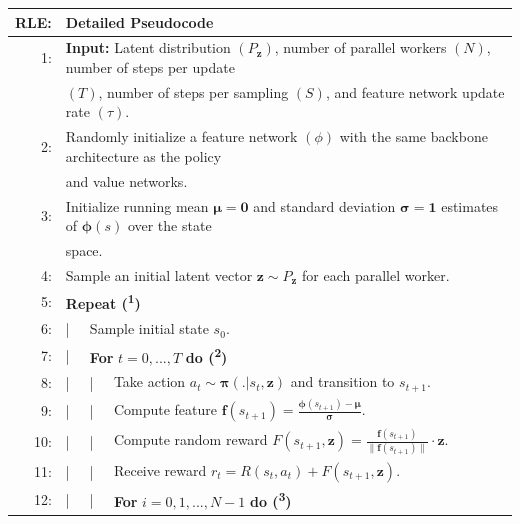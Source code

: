 \hypertarget{algo-rle}{
\begin{table}[h!]
  \centering
  \begin{tabular}{rlllll}
    \hline\hline
    \textbf{RLE:} & \multicolumn{5}{l}{Detailed Pseudocode}\\
    \hline
    1: & \multicolumn{5}{l}{\textbf{Input:} Latent distribution $\left(P_{\textbf{z}}\right)$, number of parallel workers $\left(N\right)$, number of steps per update}\\
    & \multicolumn{5}{l}{$\left(T\right)$, number of steps per sampling $\left(S\right)$, and feature network update rate $\left(\tau\right)$.}\\
    2: & \multicolumn{5}{l}{Randomly initialize a feature network $\left(\phi\right)$ with the same backbone architecture as the policy }\\
    & \multicolumn{5}{l}{and value networks.}\\
    3: & \multicolumn{5}{l}{Initialize running mean $\boldsymbol{\mu} = \textbf{0}$ and standard deviation $\boldsymbol{\sigma} = \textbf{1}$ estimates of $\boldsymbol{\phi} \left(s\right)$ over the state}\\
    & \multicolumn{5}{l}{space.}\\
    4: & \multicolumn{5}{l}{Sample an initial latent vector $\textbf{z} \sim P_{\textbf{z}}$ for each parallel worker.}\\
    5: & \multicolumn{5}{l}{\textbf{Repeat (\textsuperscript{1})}}\\
    6: & | & \multicolumn{4}{l}{Sample initial state $s_{0}$.}\\
    7: & | & \multicolumn{4}{l}{\textbf{For} $t = 0, ..., T$ \textbf{do (\textsuperscript{2})}}\\
    8: & | & | & \multicolumn{3}{l}{Take action $a_{t} \sim \boldsymbol{\pi}(. | s_{t}, \textbf{z})$ and transition to $s_{t+1}$.}\\
    9: & | & | & \multicolumn{3}{l}{Compute feature $\textbf{f}(s_{t+1}) = \frac{\boldsymbol{\phi}(s_{t+1}) - \boldsymbol{\mu}}{\boldsymbol{\sigma}}$.}\\
    10: & | & | & \multicolumn{3}{l}{Compute random reward $F(s_{t+1}, \textbf{z}) = \frac{\textbf{f}(s_{t+1})}{\| \textbf{f}(s_{t+1}) \|} \cdot \textbf{z}$.}\\
    11: & | & | & \multicolumn{3}{l}{Receive reward $r_{t} = R(s_{t}, a_{t}) + F(s_{t+1}, \textbf{z})$.}\\
    12: & | & | & \multicolumn{3}{l}{\textbf{For} $i = 0, 1, ..., N-1$ \textbf{do (\textsuperscript{3})}}\\

\end{tabular}
\end{table}}

